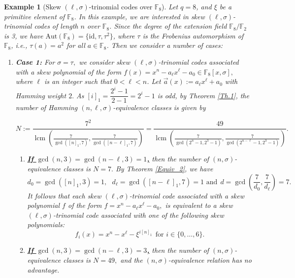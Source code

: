 \documentclass[12pt,paper]{article}
\theoremstyle{plain}
\newtheorem{example}[theorem]{Example}
\DeclareMathOperator{\lcm}{lcm}
\begin{document}
\begin{example}[Skew $(\ell,\sigma)$-trinomial  codes  over $\mathbb{F}_{8}$] 

Let $q = 8$, and $\xi$ be a primitive element of $\mathbb{F}_8$. In this example, we are interested in skew $(\ell,\sigma)$-trinomial codes of length $n$ over $\mathbb{F}_8$. Since the degree of the extension field $\mathbb{F}_{8}/\mathbb{F}_2$ is 3, we have $\text{Aut}(\mathbb{F}_{8}) = \{\text{id}, \tau,  \tau^{2}\}$, where $\tau$ is the Frobenius automorphism of $\mathbb{F}_{8}$, i.e., $\tau(a) = a^2$ for all $a\in \mathbb{F}_{8}$. Then we consider a number of cases:
\begin{enumerate}
    \item \textbf{ Case 1: }  For $ \sigma=\tau,$ we consider skew $(\ell,\sigma)$-trinomial  codes     associated with  a skew polynomial of the form $f(x) =x^{n}-a_{\ell}x^{\ell}-a_0\in \mathbb{F}_{8}[x,\sigma],$ where $\ell $ is an integer such that $0<\ell <n$.  Let $\vec{a}(x):=   a_{\ell}x^{\ell}+a_0$  with Hamming weight   $2.$
As $ [i]_1=\dfrac{2^{i}-1}{2-1}=2^i-1$ is odd, by Theorem  \ref{Th.1}, the number of  Hamming $(n,\ell, \sigma)$-equivalence classes is given by  
 
 $$N:=\dfrac{7^2}{ \lcm\left(\frac{7}{\gcd( [n]_1 ,7 )}, \frac{7}{\gcd( [n-\ell]_1,7)}  \right)}    
      =\dfrac{49}{ \lcm\left( \frac{7}{\gcd( 2^n-1 ,2^3-1 )}, \frac{7}{ \gcd( 2^{n-\ell}-1 ,2^3-1 )}\right)} .
 $$
 
 
 \begin{enumerate}
\item \underline{\textbf{If $ \gcd(n, 3)=\gcd(n-\ell, 3)=1$,}}  then the number of $(n,\sigma)$-equivalence classes is   $  N=7.$ By Theorem \ref{Equiv_2}, we have 
     $$  d_0= \gcd([n]_1, 3)=1, \ \ \ d_{\ell}= \gcd( [n-\ell]_1, 7)= 1 \text{ and} \ \  d=\gcd\left( \frac{ 7}{d_0}, \frac{ 7}{d_{\ell}}\right)= 7.$$
 It follows that each  skew $(\ell,\sigma)$-trinomial  code associated with a skew  polynomial $f$ of the form  $f =x^{n}- a_{\ell} x^{\ell}-a_0,$ is equivalent to a  skew $(\ell,\sigma)$-trinomial  code  associated with one of the following  skew polynomials: 
  $$f_{i}(x)= x^{n} - x^{\ell} - \xi^{ i [n]_1 }  \ \ \text{for } i\in \{0,\ldots, 6\}.  $$ 
 
     \item \underline{\textbf{If  $  \gcd(n, 3)= \gcd(n-\ell, 3)=3 $,}} then the number of $(n,\sigma)$-equivalence classes is   $  N=49,$ and the $(n,\sigma)$-equivalence relation has no advantage.


\end{enumerate}
\end{enumerate}
\end{example}
\end{document}
